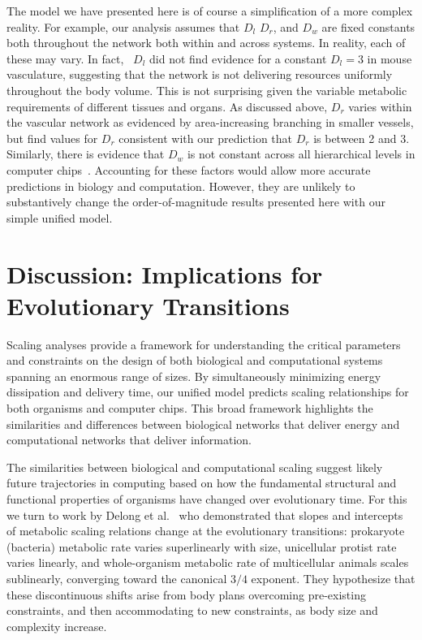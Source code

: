 \documentclass[12pt]{article}
\begin{document}
The model we have presented here is of course a simplification of a more complex reality. For example, our analysis assumes that $D_l$ $D_r$, and $D_w$ are fixed constants both throughout the network both within and across systems. In reality, each of these may vary. In fact,~\cite{newberry2015testing} $D_l$ did not find evidence for a constant $D_l = 3$ in mouse vasculature, suggesting that the network is not delivering resources uniformly throughout the body volume. This is not surprising given the variable metabolic requirements of different tissues and organs. As discussed above, $D_r$ varies within the vascular network as evidenced by area-increasing branching in smaller vessels, but \cite{newberry2015testing} find values for $D_r$ consistent with our prediction that $D_r$ is between 2 and 3. Similarly, there is evidence that $D_w$ is not constant across all hierarchical levels in computer chips~\cite{ozaktas2004information}. Accounting for these factors would allow more accurate predictions in biology and computation.  However, they are unlikely to substantively change the order-of-magnitude results presented here with our simple unified model. 

\section{Discussion: Implications for Evolutionary Transitions}
\label{sec:discussion}

Scaling analyses provide a framework for understanding the critical parameters and constraints on the design of both biological and computational systems spanning an
enormous range of sizes.  By simultaneously minimizing energy dissipation and delivery
time, our unified model 
predicts scaling relationships for both
organisms and computer chips.  This broad framework highlights the similarities
and differences between biological networks that deliver energy and
computational networks that deliver information. 

The similarities between biological and computational scaling
suggest likely future trajectories in computing based on how the fundamental structural and functional properties of organisms have changed over evolutionary time. For this we turn to work by Delong et al.~\cite{delong2010shifts} who
demonstrated that slopes and intercepts of metabolic scaling relations change at the
evolutionary transitions: prokaryote (bacteria) metabolic rate varies superlinearly with
size, unicellular protist rate varies linearly, and whole-organism metabolic rate of multicellular animals scales sublinearly, converging toward the canonical $3/4$ exponent. They
hypothesize that these discontinuous shifts arise from body plans overcoming pre-existing
constraints, and then accommodating to new constraints, as body size and complexity increase.
\end{document}
